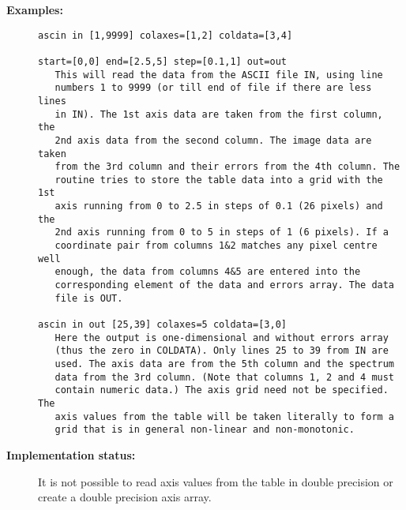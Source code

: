 \begin{description}
\begin{verbatim}
\end{verbatim}

\item [{\bf Examples:}]
\begin{verbatim}
ascin in [1,9999] colaxes=[1,2] coldata=[3,4]

start=[0,0] end=[2.5,5] step=[0.1,1] out=out
   This will read the data from the ASCII file IN, using line
   numbers 1 to 9999 (or till end of file if there are less lines
   in IN). The 1st axis data are taken from the first column, the
   2nd axis data from the second column. The image data are taken
   from the 3rd column and their errors from the 4th column. The
   routine tries to store the table data into a grid with the 1st
   axis running from 0 to 2.5 in steps of 0.1 (26 pixels) and the
   2nd axis running from 0 to 5 in steps of 1 (6 pixels). If a
   coordinate pair from columns 1&2 matches any pixel centre well
   enough, the data from columns 4&5 are entered into the
   corresponding element of the data and errors array. The data
   file is OUT.

ascin in out [25,39] colaxes=5 coldata=[3,0]
   Here the output is one-dimensional and without errors array
   (thus the zero in COLDATA). Only lines 25 to 39 from IN are
   used. The axis data are from the 5th column and the spectrum
   data from the 3rd column. (Note that columns 1, 2 and 4 must
   contain numeric data.) The axis grid need not be specified. The
   axis values from the table will be taken literally to form a
   grid that is in general non-linear and non-monotonic.
\end{verbatim}

\item [{\bf Implementation status:}]
   It is not possible to read axis values from the table in double
   precision or create a double precision axis array.
\end{description}
